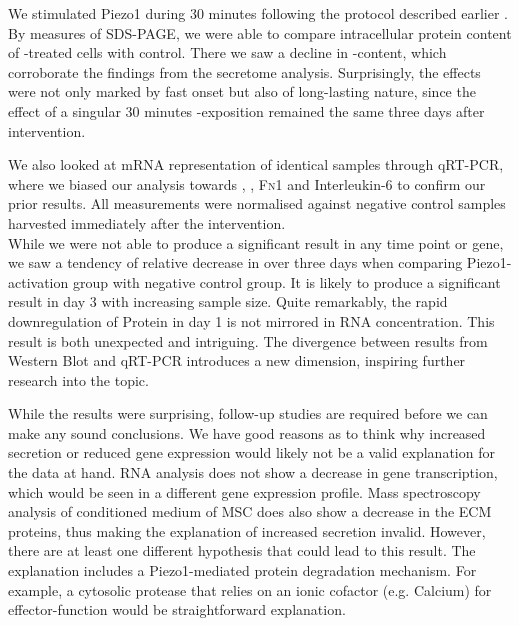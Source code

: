 We stimulated Piezo1 during 30 minutes following the protocol described earlier .
By measures of SDS-PAGE, we were able to compare intracellular protein content of \Yoda-treated cells with control. There we saw a  decline in \colone-content, which corroborate the findings from the secretome analysis. Surprisingly, the effects were not only marked by fast onset but also of long-lasting nature, since the effect of a singular 30 minutes \Yoda-exposition remained the same three days after intervention. \par

We also looked at mRNA representation of identical samples through qRT-PCR, where we biased our analysis towards \colone{ }, \colthree{}, \textsc{Fn}1 and Interleukin-6 to confirm our prior results.  All measurements were normalised against negative control samples harvested immediately after the intervention.\\
While we were not able to produce a significant result in any time point or gene, we saw a tendency of relative decrease in \colone{} over three days when comparing Piezo1-activation group with negative control group. It is likely to produce a significant result in day 3 with increasing sample size. Quite remarkably, the rapid downregulation of Protein in day 1 is not mirrored in RNA concentration. This result is both unexpected and intriguing. The divergence between results from Western Blot and qRT-PCR introduces a new dimension, inspiring further research into the topic.

While the results were surprising, follow-up studies are required before we can make any sound conclusions. We have good reasons as to think why increased secretion or reduced gene expression would likely not be a valid explanation for the data at hand. RNA analysis does not show a decrease in gene transcription, which would be seen in a different gene expression profile. Mass spectroscopy analysis of conditioned medium of MSC does also show a decrease in the ECM proteins, thus making the explanation of increased secretion invalid. However, there are at least one different hypothesis that could lead to this result. The explanation includes a Piezo1-mediated protein degradation mechanism. For example, a cytosolic protease that relies on an ionic cofactor (e.g. Calcium) for effector-function would be straightforward explanation. 


